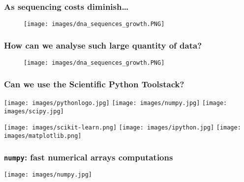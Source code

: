 \documentclass[xcolor=dvipsnames]{beamer}
\begin{document}
\begin{frame}
\frametitle{As sequencing costs diminish\dots}
\begin{figure}
\texttt{[image: images/dna\_sequences\_growth.PNG]}
\end{figure}
\end{frame}


\begin{frame}
\frametitle{How can we analyse such large quantity of data?}
\begin{figure}
\texttt{[image: images/dna\_sequences\_growth.PNG]}
\end{figure}
\end{frame}

\begin{frame}
\frametitle{Can we use the Scientific Python Toolstack?}

\begin{center}
\texttt{[image: images/pythonlogo.jpg]} \hspace{3em}
\texttt{[image: images/numpy.jpg]}\hspace{3em}
\texttt{[image: images/scipy.jpg]}
\end{center}

\vspace{1.5em}

\begin{center}
\hspace{3em}
\texttt{[image: images/scikit-learn.png]}\hspace{3em}
\texttt{[image: images/ipython.jpg]}\hspace{3em}
\texttt{[image: images/matplotlib.png]}
\end{center}
\end{frame}

\begin{frame}
\frametitle{\texttt{numpy}: fast numerical arrays computations}
\begin{center}
\texttt{[image: images/numpy.jpg]}
\end{center}
\end{frame}
\end{document}
